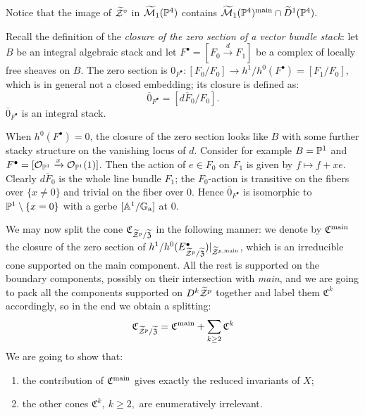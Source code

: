 Notice that the image of $\widetilde{\mathcal Z}^{\circ}$ in $\widetilde{\mathcal{M}}_1(\mathbb P^4)$ contains $\widetilde{\mathcal{M}}_1(\mathbb P^4)^{\rm{main}}\cap \widetilde{D}^1(\mathbb P^4).$

Recall the definition of the \emph{closure of the zero section of a vector bundle stack}: let $B$ be an integral algebraic stack and let $F^{\bullet}=[F_0\xrightarrow{d} F_1]$ be a complex of locally free sheaves on $B$. The zero section is $0_{F^{\bullet}}\colon [F_0/F_0]\to h^1/h^0(F^{\bullet})=[F_1/F_0]$, which is in general not a closed embedding; its closure is defined as:
\[ \overline{0}_{F^{\bullet}}=[\overline{dF_0}/F_0]. \]
$\overline{0}_{F^{\bullet}}$ is an integral stack.

\begin{ex}
When $h^0(F^{\bullet})=0$, the closure of the zero section looks like $B$ with some further stacky structure on the vanishing locus of $d$. Consider for example $B=\mathbb P^1$ and $F^{\bullet}=[\mathcal{O}_{\mathbb P^1}\xrightarrow{x}\mathcal{O}_{\mathbb P^1}(1)]$. Then the action of $e\in F_0$ on $F_1$ is given by $f\mapsto f+xe$. Clearly $\overline{dF_0}$ is the whole line bundle $F_1$; the $F_0$-action is transitive on the fibers over $\{x\neq 0\}$ and trivial on the fiber over $0$. Hence $\overline{0}_{F^{\bullet}}$ is isomorphic to $\mathbb P^1\setminus\{x=0\}$ with a gerbe $[\mathbb{A}^1/\mathbb G_{\rm a}]$ at $0$.
\end{ex}

We may now split the cone $\mathfrak{C}_{\widetilde{\mathcal Z}^p/\widetilde{\mathfrak Z}}$ in the following manner: we denote by $\mathfrak C^{\rm{main}}$ the closure of the zero section of $h^1/h^0(E^{\bullet}_{\widetilde{\mathcal Z}^p/\widetilde{\mathfrak Z}})\rvert_{\widetilde{\mathcal Z}^{p,\rm{main}}}$, which is an irreducible cone supported on the main component. All the rest is supported on the boundary components, possibly on their intersection with \emph{main}, and we are going to pack all the components supported on $D^k\widetilde{\mathcal Z}^p$ together and label them $\mathfrak C^k$ accordingly, so in the end we obtain a splitting:
\[
 \mathfrak{C}_{\widetilde{\mathcal Z}^p/\widetilde{\mathfrak Z}}=\mathfrak C^{\rm{main}}+\sum_{k\geq 2} \mathfrak C^k
\]
We are going to show that:
\begin{enumerate}
 \item the contribution of $\mathfrak C^{\rm{main}}$ gives exactly the reduced invariants of $X$;
 \item the other cones $\mathfrak C^k,\ k\geq 2,$ are enumeratively irrelevant.
\end{enumerate}
